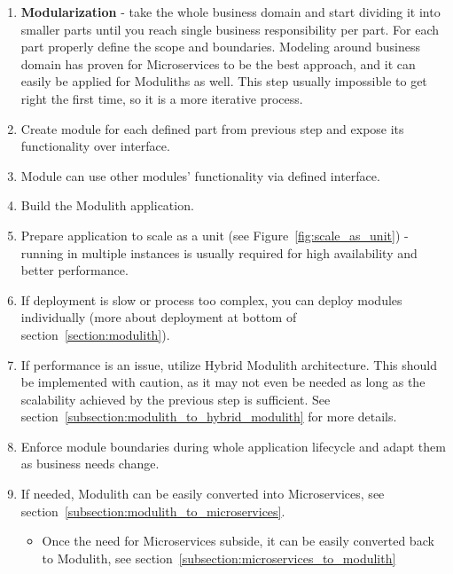 \begin{enumerate}
    \item \textbf{Modularization} - take the whole business domain and start dividing it into smaller parts until you reach single business responsibility per part. For each part properly define the scope and boundaries. Modeling around business domain has proven for Microservices to be the best approach\cite{BUILDING_MS_WHAT_ARE}, and it can easily be applied for Moduliths as well. This step usually impossible to get right the first time, so it is a more iterative process.
    \item Create module for each defined part from previous step and expose its functionality over interface.
    \item Module can use other modules' functionality via defined interface.
    \item Build the Modulith application.
    \item Prepare application to scale as a unit (see Figure~\ref{fig:scale_as_unit}) - running in multiple instances is usually required for high availability and better performance.
    \item If deployment is slow or process too complex, you can deploy modules individually (more about deployment at bottom of section~\ref{section:modulith}).
    \item If performance is an issue, utilize Hybrid Modulith architecture. This should be implemented with caution, as it may not even be needed as long as the scalability achieved by the previous step is sufficient. See section~\ref{subsection:modulith_to_hybrid_modulith} for more details.
        
    \item Enforce module boundaries during whole application lifecycle and adapt them as business needs change.
    \item If needed, Modulith can be easily converted into Microservices, see section~\ref{subsection:modulith_to_microservices}.
    \begin{itemize}
        \item Once the need for Microservices subside, it can be easily converted back to Modulith, see section~\ref{subsection:microservices_to_modulith}
    \end{itemize}
\end{enumerate}

